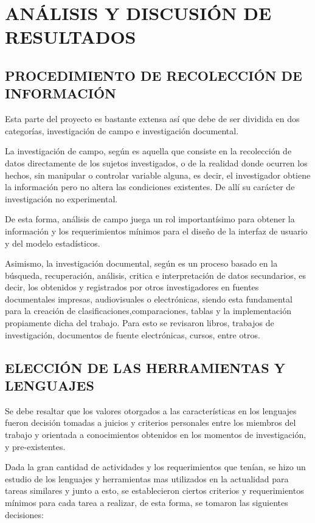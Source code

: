 \thispagestyle{empty}

\section{ANÁLISIS Y DISCUSIÓN DE RESULTADOS}

\subsection{PROCEDIMIENTO DE RECOLECCIÓN DE INFORMACIÓN}
Esta parte del proyecto es bastante extensa así que debe de ser dividida en dos
categorías, investigación de campo e investigación documental.

La investigación de campo, según \textcite{MetodologiaInvestigacion}
es aquella que consiste en la recolección de datos directamente de los sujetos
investigados, o de la realidad donde ocurren los hechos,
sin manipular o controlar variable alguna, es decir, el investigador obtiene la
información pero no altera las  condiciones existentes. De allí su carácter de
investigación no experimental.

De esta forma, análisis de campo juega un rol importantísimo para obtener la
información y los requerimientos mínimos para el diseño de la interfaz de usuario
y del modelo estadísticos.

Asimismo, la investigación documental, según \textcite{MetodologiaInvestigacion}
es un proceso
basado en la búsqueda, recuperación, análisis, critica e interpretación de datos
secundarios, es decir, los obtenidos y registrados por otros investigadores en
fuentes documentales impresas, audiovisuales o electrónicas,
siendo esta fundamental para la creación de clasificaciones,comparaciones, tablas
y la implementación propiamente dicha del trabajo. Para esto se revisaron
libros, trabajos de investigación, documentos de fuente electrónicas, cursos,
entre otros.

\subsection{ELECCIÓN DE LAS HERRAMIENTAS Y LENGUAJES}
Se debe resaltar que los valores otorgados a las características en los lenguajes
fueron decisión tomadas a juicios y criterios  personales entre los miembros
del trabajo y orientada a conocimientos obtenidos en los momentos de investigación,
y pre-existentes.

    Dada la gran cantidad de actividades y los requerimientos que tenían,
    se hizo un estudio de los lenguajes y herramientas mas utilizados en
    la actualidad para tareas similares y junto a esto, se establecieron
    ciertos criterios y requerimientos mínimos para cada tarea a realizar, de
    esta forma, se tomaron las siguientes decisiones:

